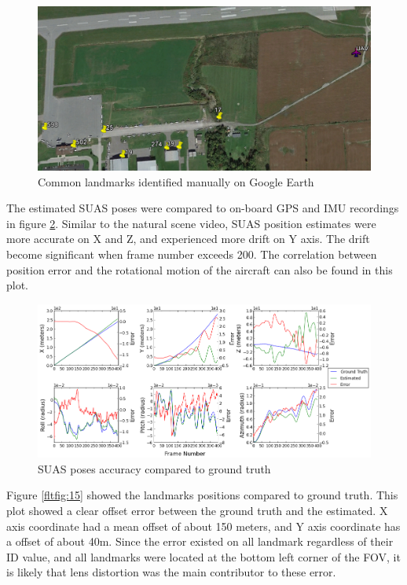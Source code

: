 \begin{figure}[h]
\centering
\includegraphics[width=13cm, keepaspectratio=true]
{./Figures/fltfig/airport/uav_and_identified_landmark.png}
\caption{Common landmarks identified manually on Google Earth }
\label{fltfig:12}
\end{figure}
\FloatBarrier The estimated SUAS poses were compared to on-board GPS
and IMU recordings in figure \ref{fltfig:13}. Similar to the natural
scene video, SUAS position estimates were more accurate on X and Z,
and experienced more drift on Y axis. The drift become significant
when frame number exceeds 200. The correlation between position error
and the rotational motion of the aircraft can also be found in this
plot.

\begin{figure}[h]
\centering
\includegraphics[width=17cm, keepaspectratio=true]
{./Figures/fltfig/airport/Figure10.png}
\caption{SUAS poses accuracy compared to ground truth}
\label{fltfig:13}
\end{figure}
\FloatBarrier

Figure \ref{fltfig:15} showed the landmarks positions compared to
ground truth. This plot showed a clear offset error between the ground
truth and the estimated. X axis coordinate had a mean offset of about
150 meters, and Y axis coordinate has a offset of about 40m. Since the
error existed on all landmark regardless of their ID value, and all
landmarks were located at the bottom left corner of the FOV, it is
likely that lens distortion was the main contributor to these error.


